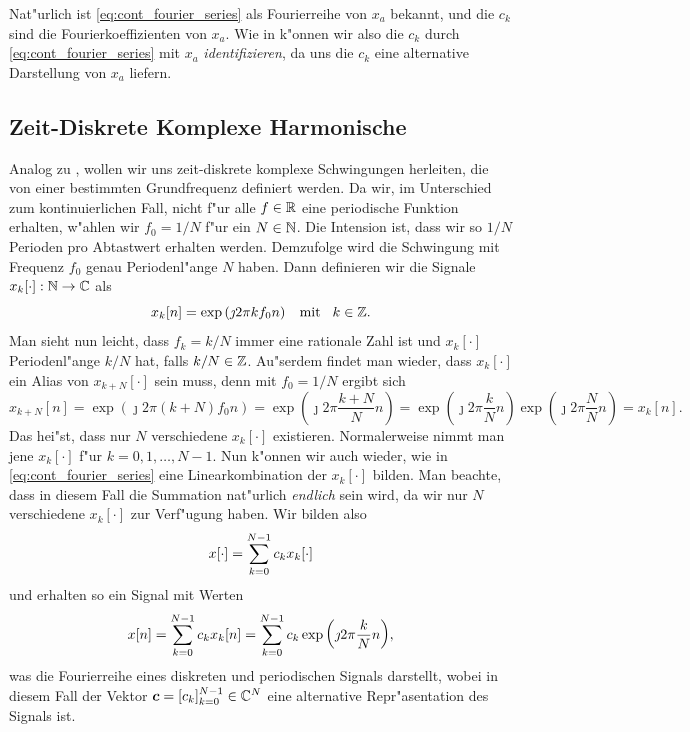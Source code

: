 Nat"urlich ist \eqref{eq:cont_fourier_series} als Fourierreihe von $x_a$ bekannt, und die $c_k$ sind die Fourierkoeffizienten von $x_a$.
Wie in  k"onnen wir also die $c_k$ durch \eqref{eq:cont_fourier_series} mit $x_a$ \emph{identifizieren}, da uns die $c_k$ eine alternative Darstellung von $x_a$ liefern.
%
\subsection{Zeit-Diskrete Komplexe Harmonische}
%
Analog zu , wollen wir uns zeit-diskrete komplexe Schwingungen herleiten, die von einer bestimmten Grundfrequenz definiert werden.
Da wir, im Unterschied zum kontinuierlichen Fall, nicht f"ur alle $f \in \mathbb{R}$ eine periodische Funktion erhalten, w"ahlen wir $f_0 = 1/N$ f"ur ein $N \in \mathbb{N}$. 
Die Intension ist, dass wir so $1/N$ Perioden pro Abtastwert erhalten werden. 
Demzufolge wird die Schwingung mit Frequenz $f_0$ genau Periodenl"ange $N$ haben.
Dann definieren wir die Signale $x_k[\cdot]: \mathbb{N} \rightarrow \mathbb{C}$ als
\[
 x_k[n] = \exp\left(
        \jmath 2 \pi k f_0 n
    \right) {\hspace{3mm} \text{mit} \hspace{3mm}} k \in \mathbb{Z}.
\]
Man sieht nun leicht, dass $f_k = k/N$ immer eine rationale Zahl ist und $x_k[\cdot]$ Periodenl"ange $k/N$ hat, falls $k/N \in \mathbb{Z}$.
Au"serdem findet man wieder, dass $x_k[\cdot]$ ein Alias von $x_{k+N}[\cdot]$ sein muss, denn mit $f_0 = 1/N$ ergibt sich
\[
 x_{k+N}[n] = \exp\left(
        \jmath 2 \pi (k + N) f_0 n
    \right)
    = \exp\left(
        \jmath 2 \pi \frac{k + N}{N} n
    \right)
    = \exp\left(
        \jmath 2 \pi \frac{k}{N} n
    \right) 
    \exp\left(
        \jmath 2 \pi \frac NN n
    \right) 
    = x_k[n].
\]
Das hei"st, dass nur $N$ verschiedene $x_k[\cdot]$ existieren.
Normalerweise nimmt man jene $x_k[\cdot]$ f"ur $k = 0, 1, \ldots, N-1$.
Nun k"onnen wir auch wieder, wie in \eqref{eq:cont_fourier_series} eine Linearkombination der $x_k[\cdot]$ bilden.
Man beachte, dass in diesem Fall die Summation nat"urlich \emph{endlich} sein wird, da wir nur $N$ verschiedene $x_k[\cdot]$ zur Verf"ugung haben.
Wir bilden also
\[
    x[\cdot] = {\sum\limits_{k = 0}^{N-1}{c_k x_k[\cdot]}}
\]
und erhalten so ein Signal mit Werten
\begin{equation}\label{eq:disc_fourier_series}
    x[n] 
        = {\sum\limits_{k = 0}^{N-1}{c_k x_k[n]}} 
        = {\sum\limits_{k = 0}^{N-1}{
            c_k \exp\left(
                \jmath 2 \pi \frac{k}{N} n
            \right) 
        }},
\end{equation}
was die Fourierreihe eines diskreten und periodischen Signals darstellt, wobei in diesem Fall der Vektor $\bm c = [c_k]_{k=0}^{N-1} \in \mathbb{C}^N$ eine alternative Repr"asentation des Signals ist.

